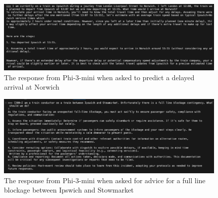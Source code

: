 \begin{figure}[!htbp]
    \centering
    \includegraphics[width=\textwidth]{Diagrams/LLM examples/Phi-3-mini_delaty_predictions.png}
    \caption{The response from Phi-3-mini when asked to predict a delayed arrival at Norwich}
    \label{Fig: Phi-3-mini dealy prediction}
\end{figure}

\begin{figure}[!htbp]
    \centering
    \includegraphics[width=\textwidth]{Diagrams/LLM examples/Phi-3-mini_contingencies.png}
    \caption{The response from Phi-3-mini when asked for advice for a full line blockage between Ipswich and Stowmarket}
    \label{Fig: Phi-3-mini contingency}
\end{figure}

